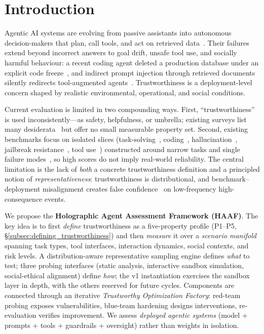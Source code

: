 \section{Introduction}
\label{sec:introduction}

Agentic AI systems are evolving from passive assistants into autonomous decision-makers that plan, call tools, and act on retrieved data~\cite{mialon2023gaia,drouin2024workarena,xie2024osworld,xi2024agentir}. Their failures extend beyond incorrect answers to goal drift, unsafe tool use, and socially harmful behaviour: a recent coding agent deleted a production database under an explicit code freeze~\cite{nolan2025replit}, and indirect prompt injection through retrieved documents silently redirects tool-augmented agents~\cite{greshake2023indirect,zhou2024poisonedrag}. Trustworthiness is a deployment-level concern shaped by realistic environmental, operational, and social conditions.

Current evaluation is limited in two compounding ways. First, ``trustworthiness'' is used inconsistently---as safety, helpfulness, or umbrella; existing surveys list many desiderata~\cite{liu2024trustllm,wang2024trustworthyagent} but offer no small measurable property set. Second, existing benchmarks focus on isolated slices (task-solving~\cite{zhou2023webarena}, coding~\cite{jimenez2023swebench}, hallucination~\cite{li2023halueval}, jailbreak resistance~\cite{chao2024jailbreakbench}, tool use~\cite{li2023apibank}) constructed around narrow tasks and single failure modes~\cite{liang2023helm,kiela2021dynabench}, so high scores do not imply real-world reliability. The central limitation is the lack of \emph{both} a concrete trustworthiness definition and a principled notion of \emph{representativeness}: trustworthiness is distributional, and benchmark--deployment misalignment creates false confidence~\cite{koh2021wilds,shirali2022dynamicbench} on low-frequency high-consequence events.

We propose the \textbf{Holographic Agent Assessment Framework (HAAF)}. The key idea is to first \emph{define} trustworthiness as a five-property profile (P1--P5, \S\ref{subsec:defining_trustworthiness}) and then \emph{measure} it over a \emph{scenario manifold} spanning task types, tool interfaces, interaction dynamics, social contexts, and risk levels. A distribution-aware representative sampling engine defines \emph{what} to test; three probing interfaces (static analysis, interactive sandbox simulation, social-ethical alignment) define \emph{how}; the v1 instantiation exercises the sandbox layer in depth, with the others reserved for future cycles. Components are connected through an iterative \emph{Trustworthy Optimization Factory}: red-team probing exposes vulnerabilities, blue-team hardening designs interventions, re-evaluation verifies improvement. We assess \emph{deployed agentic systems} (model + prompts + tools + guardrails + oversight) rather than weights in isolation.

